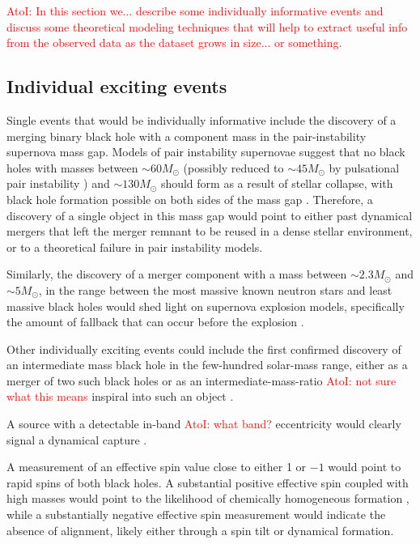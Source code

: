 \documentclass[iop,onecolumn]{revtex4}
\newcommand{\ajf}[1]{\textcolor{red}{AtoI: #1}}
\begin{document}
\ajf{In this section we... describe some individually informative events and discuss some theoretical modeling techniques that will help to extract useful info from the observed data as the dataset grows in size... or something.}

\subsection{Individual exciting events}
Single events that would be individually informative include the discovery of a merging binary black hole with a component mass in the pair-instability supernova mass gap.  Models of pair instability supernovae suggest that no black holes with masses between $\sim 60 M_\odot$ (possibly reduced to $\sim 45 M_\odot$ by pulsational pair instability \citep{Woosley:2017}) and $\sim 130 M_\odot$ should form as a result of stellar collapse, with black hole formation possible on both sides of the mass gap \citep{Marchant:2016}.  Therefore, a discovery of a single object in this mass gap would point to either past dynamical mergers that left the merger remnant to be reused in a dense stellar environment, or to a theoretical failure in pair instability models. 

Similarly, the discovery of a merger component with a mass between $\sim 2.3 M_\odot$ and $\sim 5 M_\odot$, in the range between the most massive known neutron stars and least massive black holes \citep{Ozel:2010,Farr:2011} would shed light on supernova explosion models, specifically the amount of fallback that can occur before the explosion \citep{Fryer:2012}.

Other individually exciting events could include the first confirmed discovery of an intermediate mass black hole in the few-hundred solar-mass range, either as a merger of two such black holes \citep[e.g.,][]{Veitch:2015,Graff:2015} or as an intermediate-mass-ratio \ajf{not sure what this means} inspiral into such an object \citep[e.g.,][]{Haster:2015IMRI,Haster:2016}. 

A source with a detectable in-band \ajf{what band?} eccentricity would clearly signal a dynamical capture \citep{Breivik:2016}. 

A measurement of an effective spin value close to either 1 or $-1$ would point to rapid spins of both black holes. A substantial positive effective spin coupled with high masses would point to the likelihood of chemically homogeneous formation \citep{Marchant:2016}, while a substantially negative effective spin measurement would indicate the absence of alignment, likely either through a spin tilt or dynamical formation.  
\end{document}
